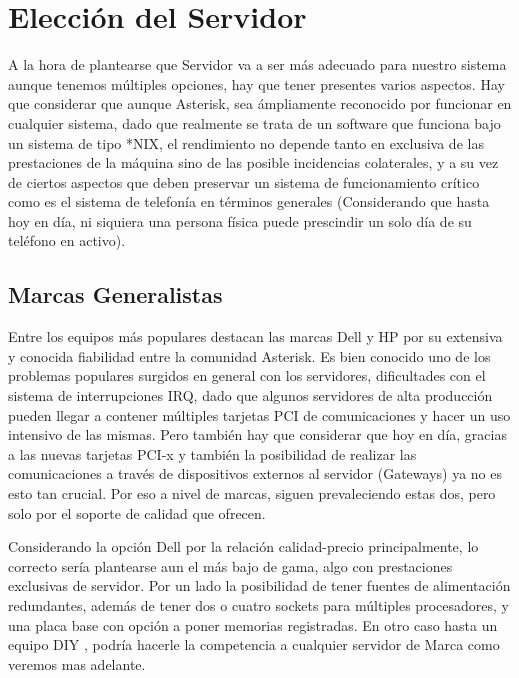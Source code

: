 
\section{Elección del Servidor}

A la hora de plantearse que Servidor va a ser más adecuado para nuestro sistema aunque tenemos múltiples opciones, hay que tener presentes varios aspectos. Hay que considerar que aunque Asterisk, sea ámpliamente reconocido por funcionar en cualquier sistema, dado que realmente se trata de un software que funciona bajo un sistema de tipo *NIX, el rendimiento no depende tanto en exclusiva de las prestaciones de la máquina sino de las posible incidencias colaterales, y a su vez de ciertos aspectos que deben preservar un sistema de funcionamiento crítico como es el sistema de telefonía en términos generales (Considerando que hasta hoy en día, ni siquiera una persona física puede prescindir un solo día de su teléfono en activo).

\subsection{Marcas Generalistas}

Entre los equipos más populares destacan las marcas Dell y HP por su extensiva y conocida fiabilidad entre la comunidad Asterisk. Es bien conocido uno de los problemas populares surgidos en general con los servidores, dificultades con el sistema de interrupciones IRQ, dado que algunos servidores de alta producción pueden llegar a contener múltiples tarjetas PCI de comunicaciones  y hacer un uso intensivo de las mismas. Pero también hay que considerar que hoy en día, gracias a las nuevas tarjetas PCI-x y también la posibilidad de realizar las comunicaciones a través de dispositivos externos al servidor (Gateways) ya no es esto tan crucial. Por eso a nivel de marcas, siguen prevaleciendo estas dos, pero solo por el soporte de calidad que ofrecen. 

Considerando la opción Dell por la relación calidad-precio principalmente, lo correcto sería plantearse aun el más bajo de gama, algo con prestaciones exclusivas de servidor. Por un lado la posibilidad de tener fuentes de alimentación redundantes, además de tener dos o cuatro sockets para múltiples procesadores, y una placa base con opción a poner memorias registradas. En otro caso hasta un equipo DIY \cite{website:diy}, podría hacerle la competencia a cualquier servidor de Marca como veremos mas adelante.

